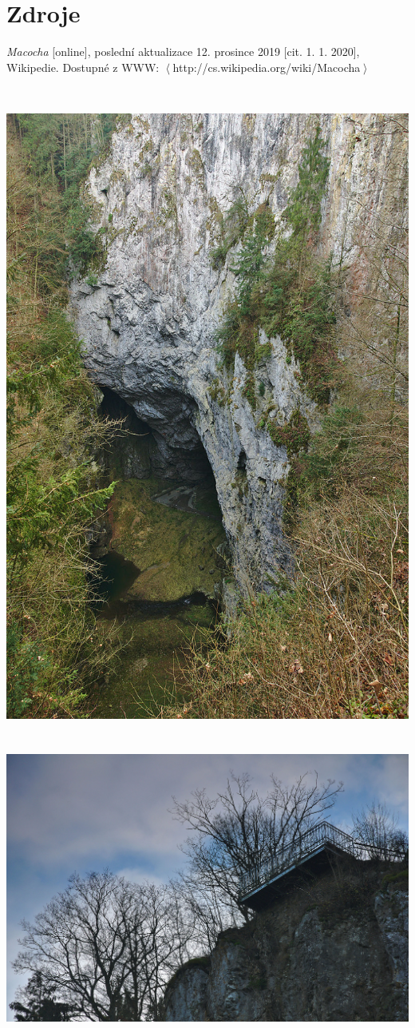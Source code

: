 \documentclass{article}
\begin{document}
\section{Zdroje}
\emph{Macocha} [online], poslední aktualizace 12. prosince 2019 [cit. 1. 1. 2020], Wikipedie. Dostupné z WWW: $\left<\right.$http://cs.wikipedia.org/wiki/Macocha$\left.\right>$

\ \\
\begin{center}
	\includegraphics[scale=01]{macocha1.jpg}
	\ \\
	\ \\

	\includegraphics[scale=0.5]{macocha2.jpg}
\end{center}
\end{document}

